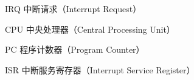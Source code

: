 \begin{denotation}

\item[IRQ] 中断请求（Interrupt Request）
\item[CPU] 中央处理器（Central Processing Unit）
\item[PC]  程序计数器（Program Counter）	
\item[ISR] 中断服务寄存器（Interrupt Service Register）

\end{denotation}
